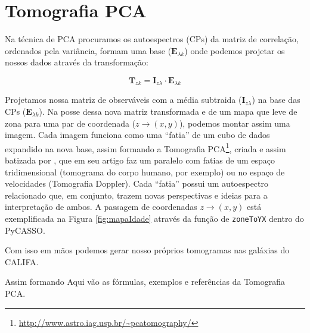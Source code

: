 \section{Tomografia PCA}
\label{sec:PCAeTomoPCA:TomoPCA}

Na técnica de PCA procuramos os autoespectros (CPs) da matriz de correlação,
ordenados pela variância, formam uma base ($\mathbf{E}{}_{\lambda k}$) onde 
podemos projetar os nossos dados através da transformação:

\begin{equation}
	\label{eq:TomoPCA:tomogram2D}
	\mathbf{T}{}_{z k} = \mathbf{I}{}_{z \lambda} \cdot \mathbf{E}{}_{\lambda k}
\end{equation}

Projetamos nossa matriz de observáveis com a média subtraida ($\mathbf{I}{}_{z
\lambda}$) na base das CPs ($\mathbf{E}{}_{\lambda k}$). Na posse dessa nova
matriz transformada e de um mapa que leve de zona para uma par de coordenada ($z
\to (x, y)$), podemos montar assim uma imagem. Cada imagem funciona como uma
``fatia'' de um cubo de dados expandido na nova base, assim formando a
Tomografia PCA\footnote{\url{http://www.astro.iag.usp.br/~pcatomography/}},
criada e assim batizada por \citet{Steiner2009}, que em seu artigo faz um
paralelo com fatias de um espaço tridimensional (tomograma do corpo humano, por
exemplo) ou no espaço de velocidades (Tomografia Doppler). Cada ``fatia'' possui
um autoespectro relacionado que, em conjunto, trazem novas perspectivas e ideias
para a interpretação de ambos. A passagem de coordenadas $z \to (x, y)$ está
exemplificada na Figura \ref{fig:mapaIdade} através da função de
\texttt{zoneToYX} dentro do PyCASSO.


Com isso em mãos podemos gerar nosso próprios tomogramas nas galáxias do CALIFA.


Assim formando 
\ojo Aqui vão as fórmulas, exemplos e referências da Tomografia PCA.


